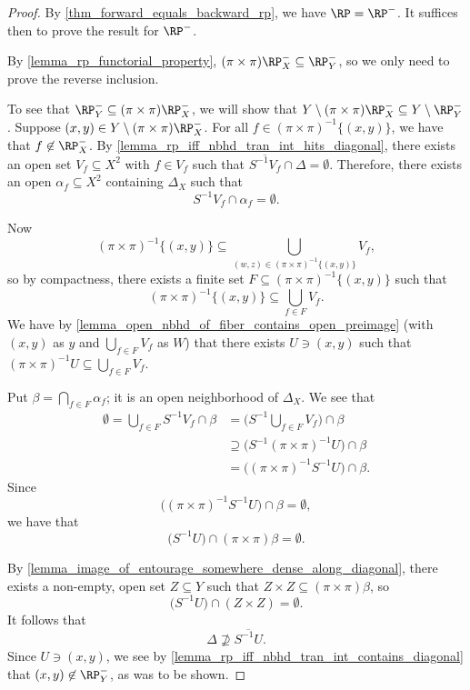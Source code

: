 \begin{proof}
    By \cref{thm_forward_equals_backward_rp}, we have $\RP = \RP^-$.  It suffices then to prove the result for $\RP^-$.

        By \cref{lemma_rp_functorial_property}, $(\pi \times \pi) \RP^-_X \subseteq \RP^-_Y$, so we only need to prove the reverse inclusion.

    To see that $\RP^-_Y \subseteq (\pi \times \pi) \RP^-_X$, we will show that $Y \setminus (\pi \times \pi) \RP^-_X \subseteq Y \setminus \RP^-_Y$.  Suppose $(x,y) \in Y \setminus (\pi \times \pi) \RP^-_X$.  For all $f \in (\pi \times \pi)^{-1} \{(x,y)\}$, we have that $f \not\in \RP^-_X$.  By \cref{lemma_rp_iff_nbhd_tran_int_hits_diagonal}, there exists an open set $V_{f} \subseteq X^2$ with $f \in V_{f}$ such that $\overline{S^{-1}V_{f}} \cap \Delta = \emptyset$. Therefore, there exists an open $\alpha_f \subseteq X^2$ containing $\Delta_X$ such that
    \[S^{-1}V_{f} \cap \alpha_f = \emptyset.\]

    Now
    \[(\pi \times \pi)^{-1} \{(x,y)\} \subseteq \bigcup_{(w,z) \in (\pi \times \pi)^{-1} \{(x,y)\}} V_{f},\]
    so by compactness, there exists a finite set $F \subseteq (\pi \times \pi)^{-1} \{(x,y)\}$ such that
    \[(\pi \times \pi)^{-1} \{(x,y)\} \subseteq \bigcup_{f \in F} V_{f}.\]
    We have by \cref{lemma_open_nbhd_of_fiber_contains_open_preimage} (with $(x,y)$ as $y$ and $\bigcup_{f \in F} V_{f}$ as $W$) that there exists $U \ni (x,y)$ such that $(\pi \times \pi)^{-1} U \subseteq \bigcup_{f \in F} V_{f}$.

    Put $\beta = \bigcap_{f \in F} \alpha_f$; it is an open neighborhood of $\Delta_X$. We see that
    \begin{align*}
        \emptyset = \bigcup_{f \in F} S^{-1}V_f \cap \beta  &= \big( S^{-1} \bigcup_{f \in F} V_f \big) \cap \beta \\
        &\supseteq \big(S^{-1} (\pi \times \pi)^{-1} U \big) \cap \beta \\
        & = \big((\pi \times \pi)^{-1} S^{-1} U \big) \cap \beta.
    \end{align*}
    Since
    \[\big((\pi \times \pi)^{-1} S^{-1} U \big) \cap \beta = \emptyset,\]
    we have that
    \[\big(S^{-1} U \big) \cap (\pi \times \pi) \beta  = \emptyset.\]

    
    By \cref{lemma_image_of_entourage_somewhere_dense_along_diagonal}, there exists a non-empty, open set $Z \subseteq Y$ such that $Z \times Z \subseteq (\pi \times \pi) \beta$, so
    \[\big(S^{-1} U \big) \cap (Z \times Z)  = \emptyset.\]
    It follows that
    \[\Delta \not\supseteq \overline{S^{-1} U}.\]
    Since $U \ni (x,y)$, we see by \cref{lemma_rp_iff_nbhd_tran_int_contains_diagonal} that $(x,y) \not\in \RP^-_Y$, as was to be shown.
\end{proof}




